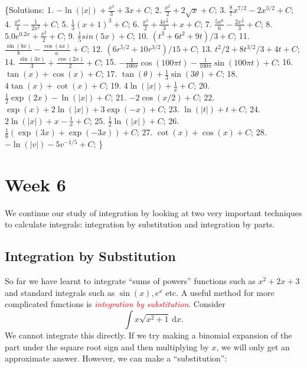 \documentclass[
  11pt,
  oneside]{book}
\newcommand{\slide}{}
\theoremstyle{definition}
\theoremstyle{definition}
\theoremstyle{definition}
\theoremstyle{definition}
\theoremstyle{remark}
\begin{document}
\{Solutions:
1. \(-\ln(|x|)+{\frac{x^3}{3}}+3x+C\);
2. \({\frac{x^2}{2}}+2\sqrt{x}+C\);
3. \(\frac{8}{7}x^{7/2} - 2x^{3/2}+C\);
4. \({\frac{x^4}{4}}-{\frac{1}{2x^2}}+C\);
5. \(\frac{1}{3}(x+1)^3+C\);
6. \({\frac{x^2}{2}}+\frac{4x^{\frac{3}{2}}}{3}+x+C\);
7. \({\frac{5x^6}{6}}-\frac{2x^{\frac{3}{2}}}{3}+C\);
8. \(5.0e^{0.2x}+\frac{x^2}{2}+C\);
9. \(\frac{1}{5}sin(5x)+C\);
10. \((t^3+6t^2+9t)/3+C\);
11. \(\frac{\sin(bx)}{b}-\frac{\cos(ax)}{a}+C\);
12. \((6r^{5/2}+10r^{3/2})/15+C\);
13. \(t^2/2 + 8t^{3/2}/3+4t+C\);
14. \(\frac{\sin(3x)}{3}+\frac{\cos(2x)}{2}+C\);
15. \(-\frac{1}{100\pi}\cos(100\pi t) - \frac{1}{100\pi}\sin(100\pi t) + C\);
16. \(\tan(x)+\cos(x)+C\);
17. \(\tan(\theta) + \frac{1}{3}\sin(3\theta)+C\);
18. \(4\tan(x) + \cot(x) +C\);
19. \(4\ln(|x|) + \frac{1}{x} +C\);
20. \(\frac{1}{2}\exp(2x)-\ln(|x|) + C\);
21. \(-2\cos(x/2)+C\);
22. \(\exp(x) + 2\ln(|x|) +3\exp(-x)+C\);
23. \(\ln(|t|) + t + C\);
24. \(2\ln(|x|) + x - \frac{1}{x} + C\);
25. \(\frac{1}{2}\ln(|x|)+C\);
26. \(\frac{1}{6}(\exp(3x)+\exp(-3x)) + C\);
27. \(\cot(x)+\cos(x)+C\);
28. \(-\ln(|v|)-5 v^{-1/5}+C\);
\}

\chapter{Week 6}\label{week-six}

We continue our study of integration by looking at two very important techniques to calculate integrals: integration by substitution and integration by parts.

\slide

\section{Integration by Substitution}\label{integration-by-substitution}

So far we have learnt to integrate ``sums of powers'' functions such as \(x^2 + 2x + 3\) and standard integrals such as \(\sin(x), e^x\) etc. A useful method for more complicated functions is \textcolor{red}{\em integration by substitution}. Consider
\begin{equation}
\int x\sqrt{x^2+1} \,\mathrm{d}x.
\label{eq:6-1}
\end{equation}
We cannot integrate this directly. If we try making a binomial expansion of the part under the square root sign and then multiplying by \(x\), we will only get an approximate answer. However, we can make a ``substitution'':
\end{document}
